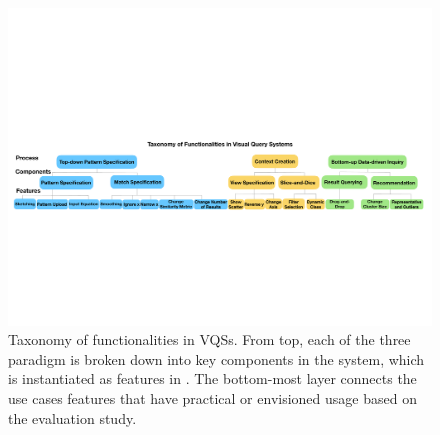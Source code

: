 \begin{figure}[ht!]
  \centering
  \includegraphics[width=0.95\linewidth]{figures/full_taxonomy_invert.pdf}
  \caption{Taxonomy of functionalities in VQSs. From top, each of the three paradigm is broken down into key components in the system, which is instantiated as features in \zvpp. The bottom-most layer connects the use cases features that have practical or envisioned usage based on the evaluation study.}
  \label{fig:taxonomy}
  \vspace{-10pt}
\end{figure}
